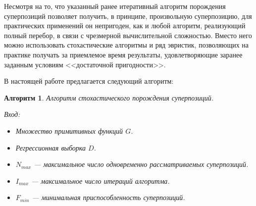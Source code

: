 \documentclass[12pt,a4paper]{amsart}
\newtheorem{algo}{Алгоритм}
\begin{document}
Несмотря на то, что указанный ранее итеративный алгоритм порождения
суперпозиций позволяет получить, в принципе, произвольную суперпозицию,
для практических применений он непригоден, как и любой алгоритм, реализующий
полный перебор, в связи с чрезмерной вычислительной сложностью. Вместо него
можно использовать стохастические алгоритмы и ряд эвристик, позволяющих на
практике получать за приемлемое время результаты, удовлетворяющие заранее
заданным условиям <<достаточной пригодности>>.

В настоящей работе предлагается следующий алгоритм:

\begin{algo}
  Алгоритм стохастического порождения суперпозиций.

  Вход:
  \begin{itemize}
	\item Множество примитивных функций $G$.
	\item Регрессионная выборка $D$.
	\item $N_{max}$ --- максимальное число одновременно рассматриваемых
	  суперпозиций.
	\item $I_{max}$ --- максимальное число итераций алгоритма.
	\item $F_{min}$ --- минимальная приспособленность суперпозиций.
  \end{itemize}
\end{algo}
\end{document}
